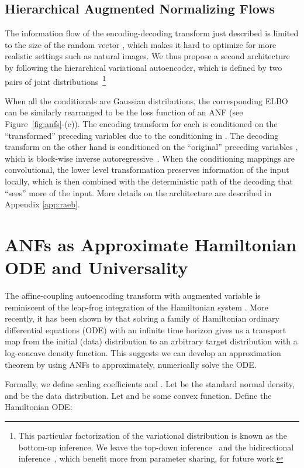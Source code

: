 \documentclass{article}
\begin{document}
\subsection{Hierarchical Augmented Normalizing Flows}
The information flow of the encoding-decoding transform just described is limited to the size of the random vector , which makes it hard to optimize for more realistic settings such as natural images. 
We thus propose a second architecture by following the hierarchical variational autoencoder, which is defined by two pairs of joint distributions~\footnote{This particular factorization of the variational distribution is known as the bottom-up inference. We leave the top-down inference~\citep{kingma2016improved} and the bidirectional inference~\citep{maaloe2019biva}, which benefit more from parameter sharing, for future work.} 

When all the conditionals are Gaussian distributions, the corresponding ELBO can be similarly rearranged to be the loss function of an ANF (see Figure~\ref{fig:anfs}-(c)). 
The encoding transform for each  is conditioned on the ``transformed'' preceding variables   due to the conditioning in .
The decoding transform on the other hand is conditioned on the ``original'' preceding variables , which is block-wise inverse autoregressive~\citep{kingma2016improved}. 
When the conditioning mappings are convolutional, the lower level transformation preserves information of the input locally, which is then combined with the deterministic path of the decoding that ``sees'' more of the input. More details on the architecture are described in Appendix \ref{app:raeb}.
 



\section{ANFs as Approximate Hamiltonian ODE and Universality}
The affine-coupling autoencoding transform with augmented variable is reminiscent of the leap-frog integration of the Hamiltonian system \citep{neal2011mcmc}. 
More recently, it has been shown by \citet{taghvaei19a} that solving a family of Hamiltonian ordinary differential equations (ODE) with an infinite time horizon gives us a transport map from the initial (data) distribution to an arbitrary target distribution with a log-concave density function. 
This suggests we can develop an approximation theorem by using ANFs to approximately, numerically solve the ODE.

Formally, we define scaling coefficients  and .
Let  be the standard normal density, and  be the data distribution.
Let  and  be some convex function. 
Define the Hamiltonian ODE:
\end{document}
